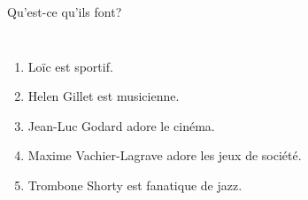 \begin{frame}{Qu'est-ce qu'ils font? }
  \begin{columns}
      \begin{enumerate}
        \item Loïc est sportif.
        \item<2-> Helen Gillet est musicienne.
        \item<3-> Jean-Luc Godard adore le cinéma.
        \item<4-> Maxime Vachier-Lagrave adore les jeux de société.
        \item<5-> Trombone Shorty est fanatique de jazz.
      \end{enumerate}
      \begin{minipage}[c][0.6\textheight]{\linewidth}
        \begin{center}
        \end{center}
      \end{minipage}
  \end{columns}
\end{frame}